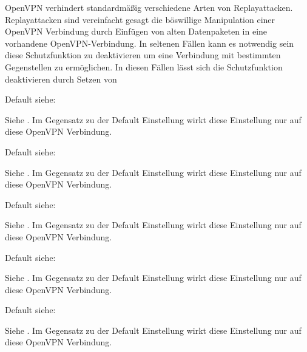 \begin{description}
  OpenVPN verhindert standardmäßig verschiedene Arten von
  Replayattacken. Replayattacken sind vereinfacht gesagt die
  böswillige Manipulation einer OpenVPN Verbindung durch Einfügen von
  alten Datenpaketen in eine vorhandene OpenVPN-Verbindung. In
  seltenen Fällen kann es notwendig sein diese Schutzfunktion zu
  deaktivieren um eine Verbindung mit bestimmten Gegenstellen zu
  ermöglichen. In diesen Fällen lässt sich die Schutzfunktion
  deaktivieren durch Setzen von



  Default siehe: 

  Siehe . Im
  Gegensatz zu der Default Einstellung wirkt diese Einstellung nur auf
  diese OpenVPN Verbindung.


  Default siehe: 

  Siehe . Im
  Gegensatz zu der Default Einstellung wirkt diese Einstellung nur auf
  diese OpenVPN Verbindung.


  Default siehe: 

  Siehe
  . Im
  Gegensatz zu der Default Einstellung wirkt diese Einstellung nur auf
  diese OpenVPN Verbindung.


  Default siehe: 

  Siehe . Im
  Gegensatz zu der Default Einstellung wirkt diese Einstellung nur auf
  diese OpenVPN Verbindung.


  Default siehe: 

  Siehe . Im
  Gegensatz zu der Default Einstellung wirkt diese Einstellung nur auf
  diese OpenVPN Verbindung.

\end{description}

